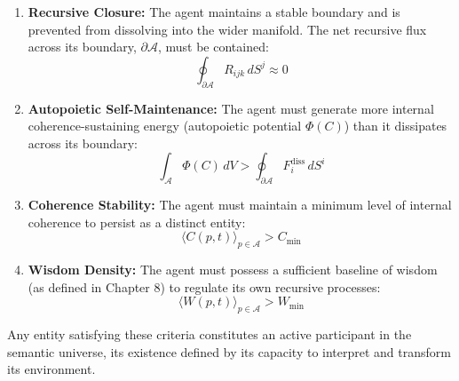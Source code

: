 \begin{enumerate}
    \item \textbf{Recursive Closure:} The agent maintains a stable boundary and is prevented from dissolving into the wider manifold. The net recursive flux across its boundary, \(\partial \mathcal{A}\), must be contained:
\begin{equation}
    \oint_{\partial \mathcal{A}} R_{ijk} \, dS^j \approx 0
\end{equation}

    \item \textbf{Autopoietic Self-Maintenance:} The agent must generate more internal coherence-sustaining energy (autopoietic potential \(\Phi(C)\)) than it dissipates across its boundary:
    \begin{equation}
    \int_{\mathcal{A}} \Phi(C) \, dV > \oint_{\partial \mathcal{A}} F_i^{\text{diss}} \, dS^i
    \end{equation}

    \item \textbf{Coherence Stability:} The agent must maintain a minimum level of internal coherence to persist as a distinct entity:
\begin{equation}
    \langle C(p,t) \rangle_{p \in \mathcal{A}} > C_{\text{min}}
\end{equation}

    \item \textbf{Wisdom Density:} The agent must possess a sufficient baseline of wisdom (as defined in Chapter 8) to regulate its own recursive processes:
    \begin{equation}
    \langle W(p,t) \rangle_{p \in \mathcal{A}} > W_{\text{min}}
    \end{equation}
\end{enumerate}

Any entity satisfying these criteria constitutes an active participant in the semantic universe, its existence defined by its capacity to interpret and transform its environment.
